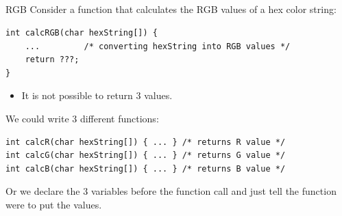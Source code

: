 \subsection{}
\begin{frame}[fragile]{RGB}
	Consider a function that calculates the RGB values of a hex color string:
	\begin{lstlisting}[numbers=none]
int calcRGB(char hexString[]) {
	... 		/* converting hexString into RGB values */
	return ???;
}
\end{lstlisting}
	\begin{itemize}
		\item It is not possible to return 3 values.
	\end{itemize}
	We could write 3 different functions:
	\begin{lstlisting}[numbers=none]
int calcR(char hexString[]) { ... }	/* returns R value */
int calcG(char hexString[]) { ... }	/* returns G value */
int calcB(char hexString[]) { ... }	/* returns B value */
\end{lstlisting}
	Or we declare the 3 variables before the function call and just tell the function were to put the values.
\end{frame}
